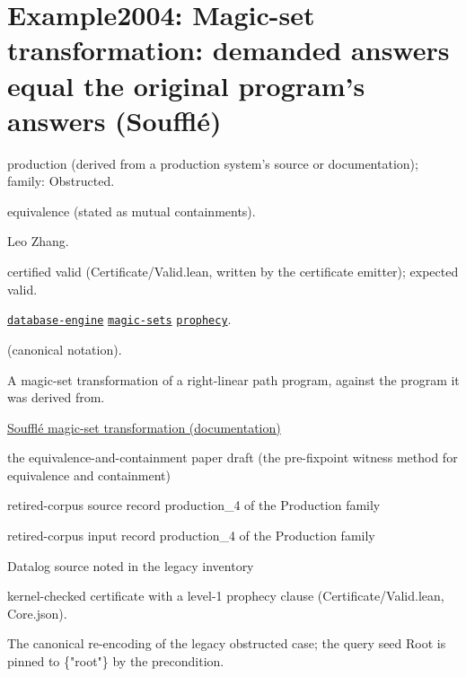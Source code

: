 \documentclass[10pt]{article}
\begin{document}
\Needspace{0.45\textheight}

\section{Example2004: Magic-set transformation: demanded answers equal the original program's answers (Soufflé)}\label{case:Example2004}

\begin{description}[leftmargin=2.6cm,style=nextline,itemsep=1pt]

\item[Category] production (derived from a production system's source or documentation); family: Obstructed.

\item[Kind] equivalence (stated as mutual containments).

\item[Contributors] Leo Zhang.

\item[Status] certified valid (Certificate/Valid.lean, written by the certificate emitter); expected valid.

\item[Tags] \hyperref[tag:database-engine]{\texttt{database-engine}} \hyperref[tag:magic-sets]{\texttt{magic-sets}} \hyperref[tag:prophecy]{\texttt{prophecy}}.

\item[Input]  (canonical notation).

\item[Summary] A magic-set transformation of a right-linear path program, against the program it was derived from.

\item[Sources] {\raggedright \href{https://souffle-lang.github.io/magicset}{Soufflé magic-set transformation (documentation)} \par the equivalence-and-containment paper draft (the pre-fixpoint witness method for equivalence and containment) \par retired-corpus source record production\_4 of the Production family \par retired-corpus input record production\_4 of the Production family \par Datalog source noted in the legacy inventory \par}

\item[Prophecy] kernel-checked certificate with a level-1 prophecy clause (Certificate/Valid.lean, Core.json).

\item[Note] The canonical re-encoding of the legacy obstructed case; the query seed Root is pinned to \{"root"\} by the precondition.

\end{description}
\end{document}
